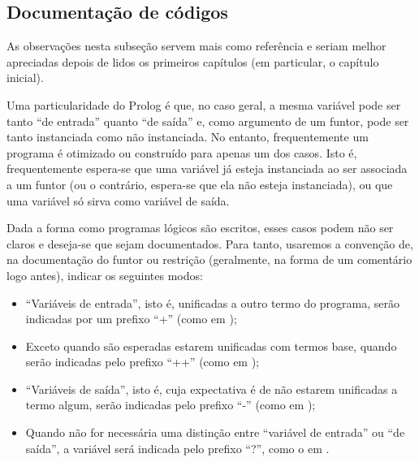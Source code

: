 \subsection*{Documentação de códigos}

  As observações nesta subseção servem mais como referência e seriam melhor apreciadas depois de
  lidos os primeiros capítulos (em particular, o capítulo inicial).

  Uma particularidade do Prolog é que, no caso geral, a mesma variável pode ser tanto ``de entrada''
  quanto ``de saída'' e, como argumento de um funtor, pode ser tanto instanciada como não
  instanciada. No entanto, frequentemente um programa é otimizado ou construído para apenas um dos
  casos. Isto é, frequentemente espera-se que uma variável já esteja instanciada ao ser associada a
  um funtor (ou o contrário, espera-se que ela não esteja instanciada), ou que uma variável só sirva
  como variável de saída.

  Dada a forma como programas lógicos são escritos, esses casos podem não ser claros e deseja-se que
  sejam documentados. Para tanto, usaremos a convenção de, na documentação do funtor ou restrição (geralmente, na
  forma de um comentário logo antes), indicar os seguintes modos:

  \begin{itemize}
    \item ``Variáveis de entrada'', isto é, unificadas a outro termo do programa, serão indicadas
      por um prefixo ``+'' (como em );
    \item Exceto quando são esperadas estarem unificadas com termos base, quando serão indicadas
      pelo prefixo ``++'' (como em );
    \item ``Variáveis de saída'', isto é, cuja expectativa é de não estarem unificadas a termo
      algum, serão indicadas pelo prefixo ``-'' (como em );
    \item Quando não for necessária uma distinção entre ``variável de entrada'' ou ``de saída'', a
      variável será indicada pelo prefixo ``?'', como o  em .
  \end{itemize}


%
